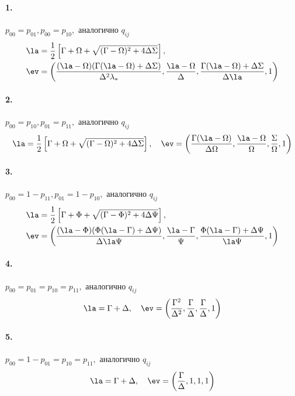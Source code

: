 \paragraph{1.} $p_{00} = p_{01}, p_{00} = p_{10},$ аналогично $q_{ij}$              
\begin{align*}
& \la = \frac{1}{2} \left[ \Gamma + \Omega + \sqrt{(\Gamma - \Omega)^2 + 4\Delta \Sigma}\right], \\
& \ev = \left(\frac{(\la - \Omega)(\Gamma (\la - \Omega) + \Delta\Sigma)}{\Delta^2 \lambda_\ast}, \frac{\la - \Omega}{\Delta}, \frac{\Gamma (\la - \Omega) + \Delta\Sigma}{\Delta \la}, 1 \right)
\end{align*}

\paragraph{2.} $p_{00} = p_{10}, p_{01} = p_{11},$ аналогично $q_{ij}$
\begin{equation*}
\la = \frac{1}{2} \left[\Gamma +\Omega + \sqrt{(\Gamma - \Omega)^2 +4 \Delta  \Sigma} \right], \quad \ev = \left(\frac{\Gamma (\la - \Omega)}{\Delta \Omega}, \frac{\la - \Omega}{\Omega}, \frac{\Sigma}{\Omega}, 1 \right)
\end{equation*}

\paragraph{3.} $p_{00} = 1 - p_{11}, p_{01} = 1 - p_{10},$ аналогично $q_{ij}$
\begin{align*}
\la & = \frac{1}{2} \left[\Gamma +\Phi + \sqrt{(\Gamma - \Phi)^2 +4 \Delta  \Psi} \right], \\
\ev & = \left( \frac{(\la -\Phi ) (\Phi  (\la -\Gamma )+\Delta  \Psi )}{\Delta  \la
   \Psi },\frac{\la -\Gamma }{\Psi },\frac{\Phi  (\la -\Gamma )+\Delta  \Psi
   }{\la  \Psi },1 \right)
\end{align*}

\paragraph{4.} $p_{00} = p_{01} = p_{10} = p_{11},$ аналогично $q_{ij}$
\begin{equation*}
\la = \Gamma +\Delta, \quad \ev = \left( \frac{\Gamma ^2}{\Delta ^2},\frac{\Gamma }{\Delta },\frac{\Gamma }{\Delta}, 1 \right)
\end{equation*}

\paragraph{5.} $p_{00} = 1 - p_{01} = p_{10} = p_{11},$ аналогично $q_{ij}$
\begin{equation*}
\la = \Gamma +\Delta, \quad \ev = \left( \frac{\Gamma }{\Delta }, 1, 1, 1 \right)
\end{equation*}

